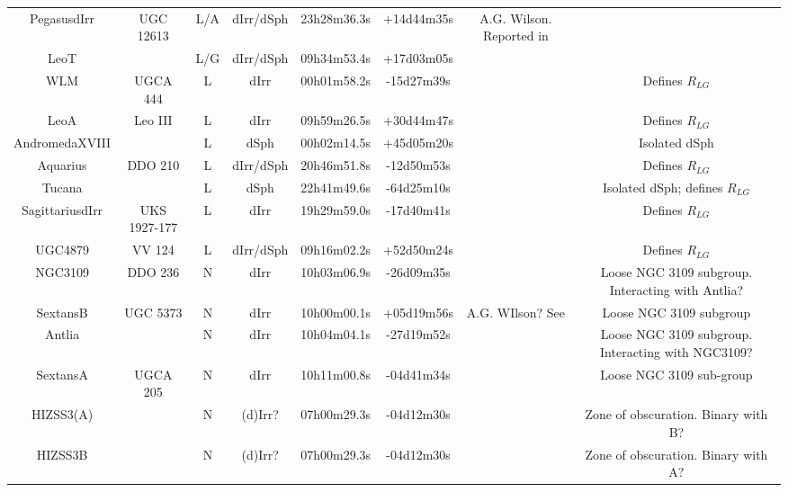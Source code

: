 \begin{table}
\begin{tabular}{cccccccc}
PegasusdIrr          & UGC 12613                &L/A& dIrr/dSph & 23h28m36.3s & +14d44m35s &A.G. Wilson. Reported in \cite{holmberg1958}&\\
LeoT		      &                          &L/G& dIrr/dSph & 09h34m53.4s & +17d03m05s &\cite{irwin2007}&\\    
WLM  & UGCA 444                 & L & dIrr & 00h01m58.2s & -15d27m39s &\cite{wolf1910} & Defines $R_{LG}$\\
LeoA                 & Leo III                  & L & dIrr & 09h59m26.5s & +30d44m47s &\cite{zwicky1942} & Defines $R_{LG}$\\
AndromedaXVIII       &                          & L & dSph & 00h02m14.5s & +45d05m20s &\cite{mcconnachie2008b}& Isolated dSph\\
Aquarius              & DDO 210	                 & L & dIrr/dSph & 20h46m51.8s & -12d50m53s &\cite{vandenbergh1959} & Defines $R_{LG}$\\
Tucana                &                          & L & dSph & 22h41m49.6s & -64d25m10s &\cite{lavery1990}\tablenotemark{b} & Isolated dSph; defines $R_{LG}$\\
SagittariusdIrr      & UKS 1927-177             & L & dIrr & 19h29m59.0s & -17d40m41s &\cite{cesarsky1977} &Defines $R_{LG}$\\
UGC4879              & VV 124                   & L & dIrr/dSph & 09h16m02.2s & +52d50m24s &\cite{kopylov2008}\tablenotemark{c} & Defines $R_{LG}$\\
NGC3109              & DDO 236                  & N & dIrr & 10h03m06.9s & -26d09m35s &\cite{herschel1847}& Loose NGC 3109 subgroup. Interacting with Antlia?\\
SextansB             & UGC 5373                 & N & dIrr & 10h00m00.1s & +05d19m56s &A.G. WIlson? See \cite{holmberg1958}\tablenotemark{d} & Loose NGC 3109 subgroup\\
Antlia                &                          & N & dIrr & 10h04m04.1s & -27d19m52s &\cite{whiting1997}\tablenotemark{e} & Loose NGC 3109 subgroup. Interacting with NGC3109?\\
SextansA             & UGCA 205                 & N & dIrr & 10h11m00.8s & -04d41m34s &\cite{zwicky1942}& Loose NGC 3109 sub-group\\
HIZSS3(A)            &                          & N &(d)Irr?& 07h00m29.3s & -04d12m30s &\cite{henning2000}\tablenotemark{f} & Zone of obscuration. Binary with B?\\
HIZSS3B              &                          & N &(d)Irr?& 07h00m29.3s & -04d12m30s &\cite{henning2000}\tablenotemark{g} & Zone of obscuration. Binary with A? \\    

\end{tabular}
\end{table}

